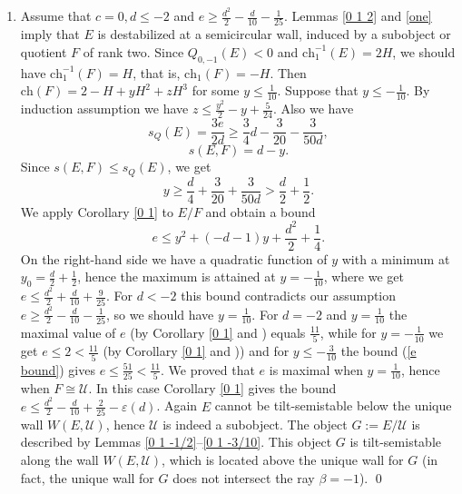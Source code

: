 \documentclass{amsart}
\begin{document}
\begin{enumerate}
		\item Assume that $c=0,d\le-2$ and $e\ge\frac{d^2}{2}-\frac{d}{10}-\frac{1}{25}$. Lemmas \ref{0 1 2} and \ref{one} imply that $E$ is destabilized at a semicircular wall, induced by a subobject or quotient $F$ of rank two. Since $Q_{0,-1}(E)<0$ and $\mathrm{ch}_1^{-1}(E)=2H$, we should have $\mathrm{ch}_1^{-1}(F)=H$, that is, $\mathrm{ch}_1(F)=-H$. Then $\mathrm{ch}(F)=2-H+yH^2+zH^3$ for some $y\le\frac{1}{10}$. Suppose that $y\le-\frac{1}{10}$. By induction assumption we have $z\le\frac{y^2}{2}-y+\frac{5}{24}$. Also we have
		$$s_Q(E)=\frac{3e}{2d}\ge\frac 34d-\frac{3}{20}-\frac{3}{50d},$$
		$$s(E,F)=d-y.$$
		Since $s(E,F)\le s_Q(E)$, we get
		$$y\ge\frac d4+\frac{3}{20}+\frac{3}{50d}>\frac d2+\frac 12.$$
		We apply Corollary \ref{0 1} to $E/F$ and obtain a bound
		\begin{equation}\label{e bound}e\le y^2+(-d-1)y+\frac{d^2}{2}+\frac 14.\end{equation}
		On the right-hand side we have a quadratic function of $y$ with a minimum at $y_0=\frac d2+\frac 12$, hence the maximum is attained at $y=-\frac{1}{10}$, where we get $e\le\frac{d^2}{2}+\frac{d}{10}+\frac{9}{25}$. For $d<-2$ this bound contradicts our assumption $e\ge\frac{d^2}{2}-\frac{d}{10}-\frac{1}{25}$, so we should have $y=\frac{1}{10}$. For $d=-2$ and $y=\frac{1}{10}$ the maximal value of $e$ (by Corollary \ref{0 1} and \cite[Lemma 3.6]{Vass}) equals $\frac{11}{5}$, while for $y=-\frac{1}{10}$ we get $e\le 2<\frac{11}{5}$ (by Corollary \ref{0 1} and \cite[Lemma 3.8]{Vass})) and for $y\le-\frac{3}{10}$ the bound (\ref{e bound}) gives $e\le\frac{51}{25}<\frac{11}{5}$. We proved that $e$ is maximal when $y=\frac{1}{10}$, hence when $F\cong\mathcal U$. In this case Corollary \ref{0 1} gives the bound $e\le\frac{d^2}{2}-\frac{d}{10}+\frac{2}{25}-\varepsilon(d)$. Again $E$ cannot be tilt-semistable below the unique wall $W(E,\mathcal U)$, hence $\mathcal U$ is indeed a subobject. The object $G:=E/\mathcal U$ is described by Lemmas \ref{0 1 -1/2}--\ref{0 1 -3/10}. This object $G$ is tilt-semistable along the wall $W(E,\mathcal U)$, which is located above the unique wall for $G$ (in fact, the unique wall for $G$ does not intersect the ray $\beta=-1$). \qed
	\end{enumerate} 
	
\end{document}
